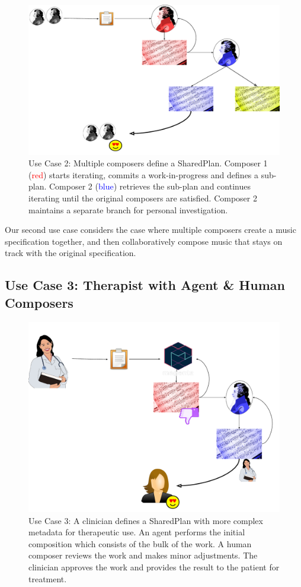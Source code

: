 \documentclass[final,authoryear,5p,times,twocolumn]{elsarticle}
\begin{document}
\begin{figure}
	\includegraphics[scale=0.35]{multicomposer.pdf}
	\caption{Use Case 2: Multiple composers define a SharedPlan. Composer 1 (\textcolor{red}{red}) starts
	iterating, commits a work-in-progress and defines a sub-plan. Composer 2 (\textcolor{blue}{blue}) retrieves the sub-plan and continues iterating until the original composers are
	satisfied. Composer 2 maintains a separate branch for personal investigation.}
	\label{fig:multicomposer}
\end{figure}


Our second use case considers the case where multiple composers create a music specification together, and then collaboratively compose music that stays on track with the original specification.

\subsection{Use Case 3: Therapist with Agent \& Human Composers}

\begin{figure}
	\includegraphics[scale=0.35]{clinical.pdf}
	\caption{Use Case 3: A clinician defines a SharedPlan with more complex metadata for therapeutic use. An agent performs the initial composition which consists of the bulk of the work.	A human composer reviews the work and makes minor adjustments. The clinician approves the work and provides the result to the patient for treatment.}
	\label{fig:clinical}
\end{figure}
\end{document}
